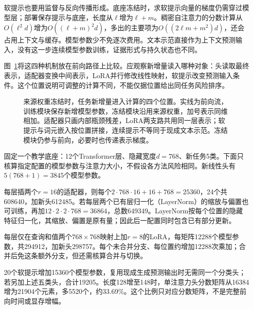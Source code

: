 软提示也要用监督与反向传播形成。底座冻结时，求软提示向量的梯度仍需穿过模型层；部署保存提示与底座，长度从$\ell$增为$\ell+m$。稠密自注意力的分数计算从$O(\ell^2d)$增为$O((\ell+m)^2d)$，多出的主要项为$O((2\ell m+m^2)d)$，还会占用上下文与缓存。模型参数少不免逐次费用。文本示范直接作为上下文预测输入，没有这一步连续模型参数训练，证据形式与持久状态也不同。

图~\ref{fig:ket-transfer-added-locations}将这四种机制放在前向路径上比较。应观察新增量读入哪种对象：头读取最终表示，适配器变换中间表示，LoRA并行修改线性映射，软提示改变预测输入条件。这个位置说明可调整的计算不同，不能仅据位置给出同任务风险排序。

\begin{figure}[htbp]
  \centering
  
  \caption{来源权重冻结时，任务新增量进入计算的四个位置。实线为前向流，训练模块保存新增模型参数，冻结模块沿用来源权重，加号表示同维相加。适配器只画内部瓶颈残差，LoRA两支路共用同一层表示；软提示与词元嵌入按位置拼接，连续提示不等同于现成文本示范。冻结模块仍参与前向，必要时也传递表示梯度。}
  \label{fig:ket-transfer-added-locations}
\end{figure}
\FloatBarrier

\begin{example}[固定底座下的模型参数与计算核算]
  \label{ex:ket-transfer-parameter-counts}
  固定一个教学底座：12个Transformer层、隐藏宽度$d=768$、新任务5类。下面只核算指定配置的模型参数与注意力大小，不假设各方法风险相同。新线性头有$5(768+1)=3845$个模型参数。

  每层插两个$r=16$的适配器，则每个$2\cdot768\cdot16+16+768=25360$，24个共608640，加新头612485。若每层两个已有层归一化（LayerNorm）的缩放与偏置也可训练，再加$12\cdot2\cdot2\cdot768=36864$，总数649349。LayerNorm按每个位置的隐藏特征归一化，其缩放、偏置是原有量；因此后一配置同时包含已有部分更新。

  每层仅在查询和值两个$768\times768$映射上加$r=8$的LoRA，每矩阵12288个模型参数，共294912，加新头298757。每个未合并分支、每位置约增加12288次乘加；合并后免这条额外分支，但还需核算合并与切换。

  20个软提示增加15360个模型参数，复用现成生成预测输出时无需同一个分类头；若另加上述五类头，合计19205。长度128增至148时，单注意力头分数矩阵从16384增为21904个元素，多5520个，约33.69\%。这个比例只对应分数矩阵，不是完整前向时间或显存增幅。
\end{example}

